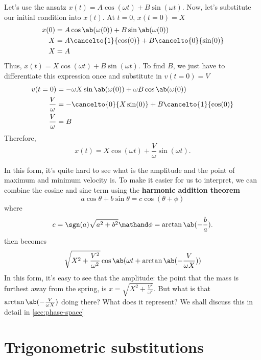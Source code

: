 Let's use the ansatz $x(t) = A\cos(\omega t) + B\sin(\omega t)$. Now, let's substitute our initial condition into $x(t)$. At $t = 0$, $x(t = 0) = X$
\begin{align}
	x(0) & = A\cos\ab(\omega(0)) + B\sin\ab(\omega(0))       \\
	X    & = A\cancelto{1}{\cos(0)} + B\cancelto{0}{\sin(0)} \\
	X    & = A
\end{align}
Thus, $x(t) = X\cos(\omega t) + B\sin(\omega t)$. To find $B$, we just have to differentiate this expression once and substitute in $v(t = 0) = V$
\begin{align}
	v(t = 0)         & = -\omega X\sin\ab(\omega (0)) + \omega B\cos\ab(\omega (0)) \\
	\frac{V}{\omega} & = - \cancelto{0}{X\sin(0)} + B\cancelto{1}{\cos(0)}          \\
	\frac{V}{\omega} & = B
\end{align}
Therefore,
\begin{equation}
	x(t) = X\cos(\omega t) + \frac{V}{\omega}\sin(\omega t). \label{eq:harmonic-oscillator-other-solutions-0}
\end{equation}

In this form, it's quite hard to see what is the amplitude and the point of maximum and minimum velocity is. To make it easier for us to interpret, we can combine the cosine and sine term using the \textbf{harmonic addition theorem}
\begin{equation}
	a\cos\theta + b\sin\theta = c\cos(\theta + \phi)
\end{equation}
where
\begin{gather}
	c = \sgn(a)\sqrt{a^2 + b^2} \mathand \phi = \arctan\ab(-\frac{b}{a}).
\end{gather}
 then becomes
\begin{equation}
	\sqrt{X^2 + \frac{V^2}{\omega^2}}\cos\ab(\omega t + \arctan\ab(-\frac{V}{\omega X}))
\end{equation}
In this form, it's easy to see that the amplitude: the point that the mass is furthest away from the spring, is $x = \sqrt{X^2 + \frac{V^2}{\omega^2}}$. But what is that $\arctan\ab(-\frac{V}{\omega X})$ doing there? What does it represent? We shall discuss this in detail in \cref{sec:phase-space}

\section{Trigonometric substitutions}

